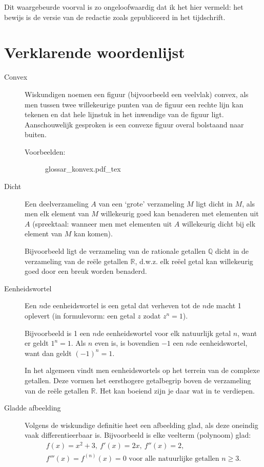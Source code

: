 	Dit waargebeurde voorval is zo ongeloofwaardig dat ik het hier vermeld: het bewijs is de versie van de redactie zoals gepubliceerd in het tijdschrift.

\clearpage

\section*{Verklarende woordenlijst}

\begin{description}

	\item[Convex] Wiskundigen noemen een figuur (bijvoorbeeld een veelvlak) convex, als men tussen twee willekeurige punten van de figuur een rechte lijn kan tekenen en dat hele lijnstuk in het inwendige van de figuur ligt. Aanschouwelijk gesproken is een convexe fi\-guur overal bolstaand naar buiten.

	Voorbeelden:
	\begin{figure}
		\def\svgwidth{230pt}
		{glossar_konvex.pdf_tex}
	\end{figure}

	\item[Dicht] Een deelverzameling $A$ van een `grote' verzameling $M$ ligt dicht in $M$, als men elk element van $M$ willekeurig goed kan benaderen met elementen uit $A$ (spreektaal: wanneer men met elementen uit $A$ willekeurig dicht bij elk element van $M$ kan komen).

	Bijvoorbeeld ligt de verzameling van de rationale getallen $\mathbb{Q}$ dicht in de verzameling van de reële getallen $\mathbb{R}$, d.w.z. elk reëel getal kan willekeurig goed door een breuk worden benaderd.

	\item[Eenheidswortel] Een $n$de eenheidswortel is een getal dat verheven tot de $n$de macht 1 oplevert (in formulevorm: een getal $z$ zodat $z^n = 1$).

	Bijvoorbeeld is 1 een $n$de eenheidswortel voor elk natuurlijk getal $n$, want er geldt $1^n = 1$. Als $n$ even is, is bovendien $-1$ een $n$de eenheidswortel, want dan geldt ${(-1)}^n = 1$.

	In het algemeen vindt men eenheidswortels op het terrein van de complexe getallen. Deze vormen het eersthogere getalbegrip boven de verzameling van de reële getallen $\mathbb{R}$. Het kan boeiend zijn je daar wat in te verdiepen.

\clearpage

	\item[Gladde afbeelding] Volgens de wiskundige definitie heet een afbeeld\-ing glad, als deze oneindig vaak differentieerbaar is. Bijvoorbeeld is elke veelterm (polynoom) glad:
	\begin{gather*}
		f(x) = x^2 + 3,\ f'(x) = 2 x,\ f''(x) = 2,\\
		f'''(x) = f^{(n)}(x) = 0 \text{ voor alle natuurlijke getallen } n \geq 3.
	\end{gather*}


\end{description}
